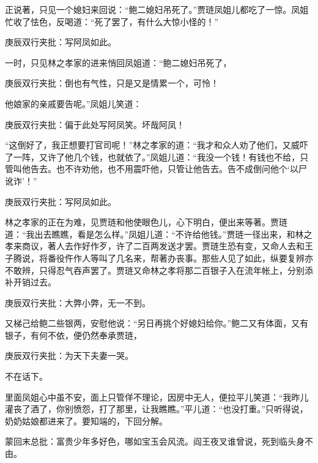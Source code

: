 \begin{parag}


    正说著，只见一个媳妇来回说：“鲍二媳妇吊死了。”贾琏凤姐儿都吃了一惊。凤姐忙收了怯色，反喝道：“死了罢了，有什么大惊小怪的！”\begin{note}庚辰双行夹批：写阿凤如此。\end{note}一时，只见林之孝家的进来悄回凤姐道：“鲍二媳妇吊死了，\begin{note}庚辰双行夹批：倒也有气性，只是又是情累一个，可怜！\end{note}他娘家的亲戚要告呢。”凤姐儿笑道：\begin{note}庚辰双行夹批：偏于此处写阿凤笑。坏哉阿凤！\end{note}“这倒好了，我正想要打官司呢！”林之孝家的道：“我才和众人劝了他们，又威吓了一阵，又许了他几个钱，也就依了。”凤姐儿道：“我没一个钱！有钱也不给，只管叫他告去。也不许劝他，也不用震吓他，只管让他告去。告不成倒问他个‘以尸讹诈’！”\begin{note}庚辰双行夹批：写阿凤如此。\end{note}林之孝家的正在为难，见贾琏和他使眼色儿，心下明白，便出来等著。贾琏道：“我出去瞧瞧，看是怎么样。”凤姐儿道：“不许给他钱。”贾琏一径出来，和林之孝来商议，著人去作好作歹，许了二百两发送才罢。贾琏生恐有变，又命人去和王子腾说，将番役仵作人等叫了几名来，帮著办丧事。那些人见了如此，纵要复辨亦不敢辨，只得忍气吞声罢了。贾琏又命林之孝将那二百银子入在流年帐上，分别添补开销过去。\begin{note}庚辰双行夹批：大弊小弊，无一不到。\end{note}又梯己给鲍二些银两，安慰他说：“另日再挑个好媳妇给你。”鲍二又有体面，又有银子，有何不依，便仍然奉承贾琏，\begin{note}庚辰双行夹批：为天下夫妻一哭。\end{note}不在话下。
\end{parag}


\begin{parag}


    里面凤姐心中虽不安，面上只管佯不理论，因房中无人，便拉平儿笑道：“我昨儿灌丧了酒了，你别愤怨，打了那里，让我瞧瞧。”平儿道：“也没打重。”只听得说，奶奶姑娘都进来了。要知端的，下回分解。
\end{parag}

\begin{parag}

    \begin{note}蒙回末总批：富贵少年多好色，哪如宝玉会风流。阎王夜叉谁曾说，死到临头身不由。\end{note}
\end{parag}
